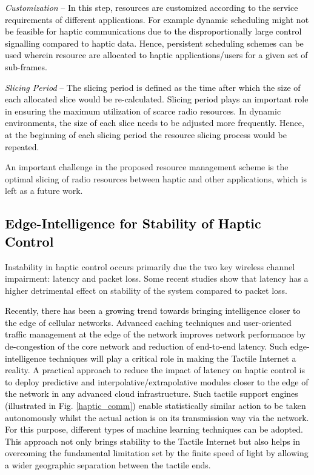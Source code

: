 \documentclass[journal]{IEEEtran}
\begin{document}
\textcolor{black}{\emph{Customization} -- In this step, resources are customized according to the service requirements of different applications. For example dynamic scheduling might not be feasible for haptic communications due to the disproportionally large control signalling compared to haptic data. Hence, persistent scheduling schemes can be used wherein resource are allocated to haptic applications/users for a given set of sub-frames.}

\textcolor{black}{\emph{Slicing Period} -- The slicing period is defined as the time after which the size of each allocated slice would be re-calculated.  Slicing period plays an important role in ensuring the maximum utilization of scarce radio resources. In dynamic environments, the size of each slice needs to be adjusted more frequently. Hence, at the beginning of each slicing period the resource slicing process would be repeated. }




An important challenge in the proposed resource management scheme is the optimal slicing of radio resources between haptic and other applications, which is left as a future work.



\subsection{\textcolor{black}{Edge-Intelligence for Stability of Haptic Control} }
Instability in haptic control occurs primarily due the two key wireless channel impairment: latency and packet loss. Some recent studies show that latency has a higher detrimental effect on stability of the system compared to packet loss.

\textcolor{black}{Recently, there has been a growing trend towards bringing intelligence closer to the edge of cellular networks. Advanced caching techniques and user-oriented traffic management at the edge of the network improves network performance by de-congestion of the core network and reduction of end-to-end latency. Such edge-intelligence techniques will play a critical role in making the Tactile Internet a reality. A practical approach to reduce the impact of latency on haptic control is to deploy predictive and interpolative/extrapolative modules closer to the edge of the network in any advanced cloud infrastructure. Such tactile support engines (illustrated in Fig. \ref{haptic_comm}) enable statistically similar action to be taken autonomously whilst the actual action is on its transmission way via the network. For this purpose, different types of machine learning techniques can be adopted. This approach not only brings stability to the Tactile Internet but also helps in overcoming the fundamental limitation set by the finite speed of light by allowing a wider geographic separation between the tactile ends.}
\end{document}
